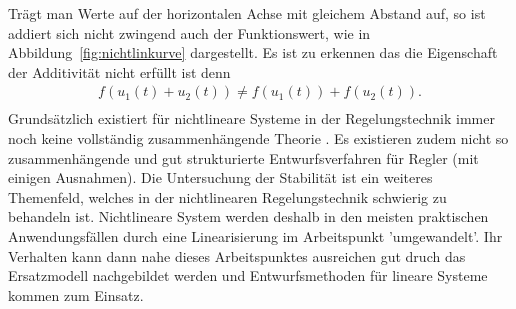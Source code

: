 %
Trägt man Werte auf der horizontalen Achse mit gleichem Abstand auf, so ist addiert sich nicht zwingend auch der Funktionswert, wie in Abbildung~\ref{fig:nichtlinkurve} dargestellt. Es ist zu erkennen das die Eigenschaft der Additivität nicht erfüllt ist denn
%
\begin{equation*}
\begin{aligned}
f\left(u_{1}(t)+u_{2}(t)\right)\neq f\left(u_{1}(t)\right)+f\left(u_{2}(t)\right).\\
\end{aligned}
\end{equation*}
%
Grundsätzlich existiert für nichtlineare Systeme in der Regelungstechnik immer noch keine vollständig zusammenhängende Theorie \cite{Adamy09}. Es existieren zudem nicht so zusammenhängende und gut strukturierte Entwurfsverfahren für Regler (mit einigen Ausnahmen).
Die Untersuchung der Stabilität ist ein weiteres Themenfeld, welches in der nichtlinearen Regelungstechnik schwierig zu behandeln ist.
Nichtlineare System werden deshalb in den meisten praktischen Anwendungsfällen durch eine Linearisierung im Arbeitspunkt 'umgewandelt'. Ihr Verhalten kann dann nahe dieses Arbeitspunktes ausreichen gut druch das Ersatzmodell nachgebildet werden und Entwurfsmethoden für lineare Systeme kommen zum Einsatz.
%
